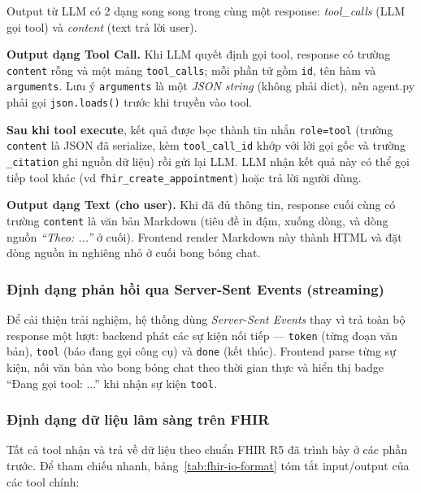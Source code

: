 \documentclass[a4paper,13pt,3p,twoside,openany]{report}
\theoremstyle{definition}
\theoremstyle{remark}
\theoremstyle{definition}
\begin{document}
Output từ LLM có 2 dạng song song trong cùng một response: \textit{tool\_calls} (LLM gọi tool) và \textit{content} (text trả lời user).

\textbf{Output dạng Tool Call.} Khi LLM quyết định gọi tool, response có trường \texttt{content} rỗng và một mảng \texttt{tool\_calls}; mỗi phần tử gồm \texttt{id}, tên hàm và \texttt{arguments}. Lưu ý \texttt{arguments} là một \textit{JSON string} (không phải dict), nên agent.py phải gọi \texttt{json.loads()} trước khi truyền vào tool.

\textbf{Sau khi tool execute}, kết quả được bọc thành tin nhắn \texttt{role=tool} (trường \texttt{content} là JSON đã serialize, kèm \texttt{tool\_call\_id} khớp với lời gọi gốc và trường \texttt{\_citation} ghi nguồn dữ liệu) rồi gửi lại LLM. LLM nhận kết quả này có thể gọi tiếp tool khác (vd \texttt{fhir\_create\_appointment}) hoặc trả lời người dùng.

\textbf{Output dạng Text (cho user).} Khi đã đủ thông tin, response cuối cùng có trường \texttt{content} là văn bản Markdown (tiêu đề in đậm, xuống dòng, và dòng nguồn \textit{``Theo: ...''} ở cuối). Frontend render Markdown này thành HTML và đặt dòng nguồn in nghiêng nhỏ ở cuối bong bóng chat.

\subsubsection{Định dạng phản hồi qua Server-Sent Events (streaming)}

Để cải thiện trải nghiệm, hệ thống dùng \textit{Server-Sent Events} thay vì trả toàn bộ response một lượt: backend phát các sự kiện nối tiếp --- \texttt{token} (từng đoạn văn bản), \texttt{tool} (báo đang gọi công cụ) và \texttt{done} (kết thúc). Frontend parse từng sự kiện, nối văn bản vào bong bóng chat theo thời gian thực và hiển thị badge ``Đang gọi tool: ...'' khi nhận sự kiện \texttt{tool}.

\subsubsection{Định dạng dữ liệu lâm sàng trên FHIR}

Tất cả tool nhận và trả về dữ liệu theo chuẩn FHIR R5 đã trình bày ở các phần trước. Để tham chiếu nhanh, bảng~\ref{tab:fhir-io-format} tóm tắt input/output của các tool chính:
\end{document}
